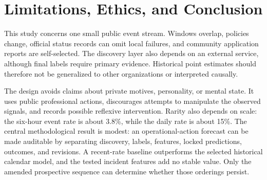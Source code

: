 \section{Limitations, Ethics, and Conclusion}

This study concerns one small public event stream. Windows overlap, policies change, official status
records can omit local failures, and community application reports are self-selected. The discovery
layer also depends on an external service, although final labels require primary evidence. Historical
point estimates should therefore not be generalized to other organizations or interpreted causally.

The design avoids claims about private motives, personality, or mental state. It uses public
professional actions, discourages attempts to manipulate the observed signals, and records possible
reflexive intervention. Rarity also depends on scale: the six-hour event rate is about 3.8\%, while
the daily rate is about 15\%. The central methodological result is modest: an operational-action forecast can be
made auditable by separating discovery, labels, features, locked predictions, outcomes, and
revisions. A recent-rate baseline outperforms the selected historical calendar model, and the tested
incident features add no stable value. Only the amended prospective sequence can determine whether
those orderings persist.

